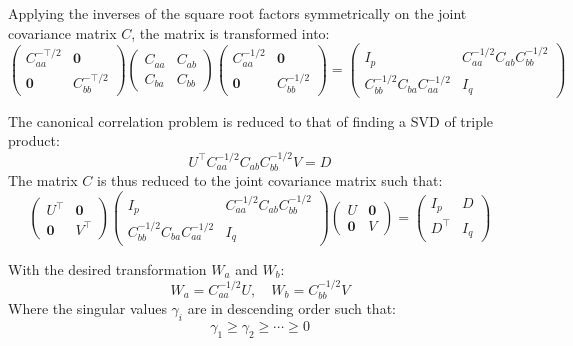 Applying the inverses of the square root factors symmetrically on the joint covariance matrix $C$, the matrix is transformed into:
\begin{equation}
\begin{pmatrix}
    C_{aa}^{-\top/2} & {\mathbf 0}\\
    {\mathbf 0} & C_{bb}^{-\top/2}
    \end{pmatrix}
    \begin{pmatrix}
    C_{aa} & C_{ab}\\
    C_{ba} & C_{bb}
    \end{pmatrix}
    \begin{pmatrix}
    C_{aa}^{-1/2} & {\mathbf 0}\\
    {\mathbf 0} & C_{bb}^{-1/2}
    \end{pmatrix}
    =
    \begin{pmatrix}
    I_p & C_{aa}^{-1/2}C_{ab}C_{bb}^{-1/2}\\
    C_{bb}^{-1/2}C_{ba}C_{aa}^{-1/2} & I_q
\end{pmatrix}
\end{equation}

The canonical correlation problem is reduced to that of finding a SVD of triple product:
\begin{equation}
    U^{\top} C_{aa}^{-1/2}C_{ab}C_{bb}^{-1/2} V = D
\end{equation}
The matrix $C$ is thus reduced to the joint covariance matrix such that:
\begin{equation}
    \begin{pmatrix}
        U^\top & {\mathbf 0}\\
        {\mathbf 0} & V^\top
    \end{pmatrix}
    \begin{pmatrix}
        I_p & C_{aa}^{-1/2}C_{ab}C_{bb}^{-1/2}\\
        C_{bb}^{-1/2}C_{ba}C_{aa}^{-1/2} & I_q
    \end{pmatrix}
    \begin{pmatrix}
        U & {\mathbf 0}\\
        {\mathbf 0} & V
    \end{pmatrix} = 
    \begin{pmatrix}
    I_p & D\\
    D^\top & I_q
    \end{pmatrix}
\end{equation}

With the desired transformation $W_a$ and $W_b$:
\begin{equation}
    W_a = C_{aa}^{-1/2} U, \quad W_b = C_{bb}^{-1/2}V
\end{equation}
Where the singular values $\gamma_i$ are in descending order such that:
\begin{equation}
    \gamma_1 \geq \gamma_2 \geq \cdots \geq 0    
\end{equation}

